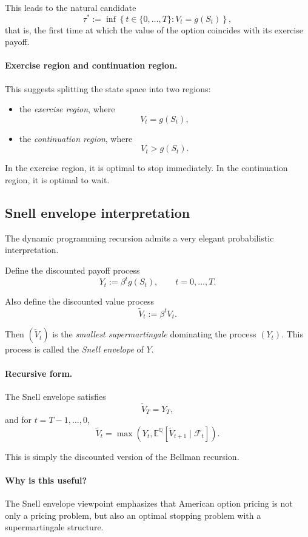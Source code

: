\documentclass[11pt]{article}
\newcommand{\Qbb}{\mathbb{Q}}
\newcommand{\E}{\mathbb{E}}
\theoremstyle{definition}
\theoremstyle{plain}
\begin{document}
This leads to the natural candidate
\[
\tau^*
:=
\inf\left\{
t\in\{0,\dots,T\}:
V_t=g(S_t)
\right\},
\]
that is, the first time at which the value of the option coincides with
its exercise payoff.

\paragraph{Exercise region and continuation region.}

This suggests splitting the state space into two regions:
\begin{itemize}[leftmargin=1.4em]
    \item the \emph{exercise region}, where
    \[
    V_t=g(S_t),
    \]
    \item the \emph{continuation region}, where
    \[
    V_t>g(S_t).
    \]
\end{itemize}

In the exercise region, it is optimal to stop immediately.
In the continuation region, it is optimal to wait.

\subsection{Snell envelope interpretation}

The dynamic programming recursion admits a very elegant probabilistic
interpretation.

Define the discounted payoff process
\[
Y_t:=\beta^t g(S_t),
\qquad t=0,\dots,T.
\]

Also define the discounted value process
\[
\widetilde V_t:=\beta^t V_t.
\]

Then \((\widetilde V_t)\) is the \emph{smallest supermartingale}
dominating the process \((Y_t)\).
This process is called the \emph{Snell envelope} of \(Y\).

\paragraph{Recursive form.}
The Snell envelope satisfies
\[
\widetilde V_T=Y_T,
\]
and for \(t=T-1,\dots,0\),
\[
\widetilde V_t
=
\max\!\left(
Y_t,
\E^{\Qbb}[\widetilde V_{t+1}\mid\mathcal{F}_t]
\right).
\]

This is simply the discounted version of the Bellman recursion.

\paragraph{Why is this useful?}
The Snell envelope viewpoint emphasizes that American option pricing is
not only a pricing problem, but also an optimal stopping problem with a
supermartingale structure.
\end{document}
